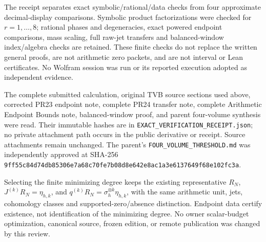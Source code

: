 The receipt separates exact symbolic/rational/data checks from four approximate decimal-display comparisons. Symbolic product factorizations were checked for \(r=1,\ldots,8\); rational phases and degeneracies, exact powered endpoint comparisons, mass scaling, full raw-jet transfers and balanced-window index/algebra checks are retained. These finite checks do not replace the written general proofs, are not arithmetic zero packets, and are not interval or Lean certificates. No Wolfram session was run or its reported execution adopted as independent evidence.

The complete submitted calculation, original TVB source sections used above, corrected PR23 endpoint note, complete PR24 transfer note, complete Arithmetic Endpoint Bounds note, balanced-window proof, and parent four-volume synthesis were read. Their immutable hashes are in \nolinkurl{EXACT_VERIFICATION_RECEIPT.json}; no private attachment path occurs in the public derivative or receipt. Source attachments remain unchanged. The parent's \nolinkurl{FOUR_VOLUME_THRESHOLD.md} was independently approved at SHA-256 \nolinkurl{9ff55c84d74db85306e7a68c70fe7b08d8e642e8ac1a3e6137649f68e102fc3a}.

Selecting the finite minimizing degree keeps the existing representative \(R_N\), \(J^{(k)}R_N=\eta_{h,k}\), and \(q^{(k)}R_N=\sigma_h^{\otimes k}\eta_{h,k}\), with the same arithmetic unit, jets, cohomology classes and supported-zero/absence distinction. Endpoint data certify existence, not identification of the minimizing degree. No owner scalar-budget optimization, canonical source, frozen edition, or remote publication was changed by this review.
